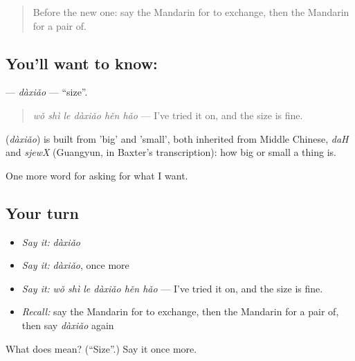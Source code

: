 \label{lesson:ZH-C108-daxiao}



\begin{quote}
Before the new one: say the Mandarin for to exchange, then the Mandarin for a pair of.
\end{quote}

\subsection*{You'll want to know: }
\textbf{} — \emph{dàxiǎo} — \textquotedblleft{}size\textquotedblright{}.

\begin{quote}
\textbf{} \emph{wǒ shì le dàxiǎo hěn hǎo} — I've tried it on, and the size is fine.
\end{quote}

\begin{cousinweb}
\textbf{} (\emph{dàxiǎo}) is built from  'big' and  'small', both inherited from Middle Chinese, \emph{daH} and \emph{sjewX} (Guangyun, in Baxter's transcription): how big or small a thing is.
\end{cousinweb}

\begin{grammarlens}[title={What you've built}]
One more word for asking for what I want.
\end{grammarlens}

\subsection*{Your turn}
\begin{itemize}
\raggedright
  \item \emph{Say it:} \emph{dàxiǎo}
  \item \emph{Say it:} \emph{dàxiǎo}, once more
  \item \emph{Say it:} \emph{wǒ shì le dàxiǎo hěn hǎo} — I've tried it on, and the size is fine.
  \item \emph{Recall:} say the Mandarin for to exchange, then the Mandarin for a pair of, then say \emph{dàxiǎo} again
\end{itemize}

\begin{tcolorbox}[breakable,colback=teal!4,colframe=teal!35!black,title={Before you move on}]
What does  mean? (\textquotedblleft{}Size\textquotedblright{}.) Say it once more.
\end{tcolorbox}

